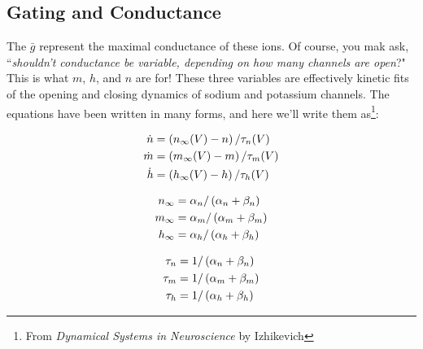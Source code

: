 \subsection{Gating and Conductance} 

\label{sec:GatingandConductance}

The $\bar{g}$ represent the maximal conductance of these ions. Of course, you mak ask, ``\textit{shouldn't conductance be variable, depending on how many channels are open}?" This is what $m$, $h$, and $n$ are for! These three variables are effectively kinetic fits of the opening and closing dynamics of sodium and potassium channels. The equations have been written in many forms, and here we'll write them as\footnote{From \textit{Dynamical Systems in Neuroscience} by Izhikevich}:

\begin{equation}
\begin{split}
    \dot{n} & = \left(n_{\infty}(V) - n\right) / \tau_n(V) \\
    \dot{m} & = \left(m_{\infty}(V) - m\right) / \tau_m(V) \\
    \dot{h} & = \left(h_{\infty}(V) - h\right) / \tau_h(V) \\
\end{split}
\end{equation}

\begin{multicols}{2}

\begin{equation}
\begin{split}
    n_{\infty} & = \alpha_n / \left(\alpha_n + \beta_n\right) \\
    m_{\infty} & = \alpha_m / \left(\alpha_m + \beta_m\right) \\
    h_{\infty} & = \alpha_h / \left(\alpha_h + \beta_h\right) \\
\end{split}
\end{equation}

\begin{equation}
\begin{split}
    \tau_n & = 1 / \left(\alpha_n + \beta_n\right) \\
    \tau_m & = 1 / \left(\alpha_m + \beta_m\right) \\
    \tau_h & = 1 / \left(\alpha_h + \beta_h\right) \\
\end{split}
\end{equation}
\end{multicols}

